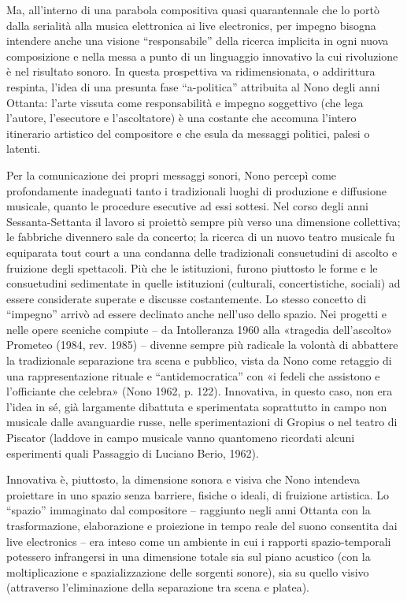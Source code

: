 Ma, all’interno di una parabola compositiva quasi quarantennale che lo portò dalla serialità alla musica elettronica ai live electronics, per impegno bisogna intendere anche una visione “responsabile” della ricerca implicita in ogni nuova composizione e nella messa a punto di un linguaggio innovativo la cui rivoluzione è nel risultato sonoro. In questa prospettiva va ridimensionata, o addirittura respinta, l’idea di una presunta fase “a-politica” attribuita al Nono degli anni Ottanta: l’arte vissuta come responsabilità e impegno soggettivo (che lega l’autore, l’esecutore e l’ascoltatore) è una costante che accomuna l’intero itinerario artistico del compositore e che esula da messaggi politici, palesi o latenti.

Per la comunicazione dei propri messaggi sonori, Nono percepì come profondamente inadeguati tanto i tradizionali luoghi di produzione e diffusione musicale, quanto le procedure esecutive ad essi sottesi. Nel corso degli anni Sessanta-Settanta il lavoro si proiettò sempre più verso una dimensione collettiva; le fabbriche divennero sale da concerto; la ricerca di un nuovo teatro musicale fu equiparata tout court a una condanna delle tradizionali consuetudini di ascolto e fruizione degli spettacoli. Più che le istituzioni, furono piuttosto le forme e le consuetudini sedimentate in quelle istituzioni (culturali, concertistiche, sociali) ad essere considerate superate e discusse costantemente. Lo stesso concetto di “impegno” arrivò ad essere declinato anche nell’uso dello spazio. Nei progetti e nelle opere sceniche compiute – da Intolleranza 1960 alla «tragedia dell’ascolto» Prometeo (1984, rev. 1985) – divenne sempre più radicale la volontà di abbattere la tradizionale separazione tra scena e pubblico, vista da Nono come retaggio di una rappresentazione rituale e “antidemocratica” con «i fedeli che assistono e l’officiante che celebra» (Nono 1962, p. 122). Innovativa, in questo caso, non era l’idea in sé, già largamente dibattuta e sperimentata soprattutto in campo non musicale dalle avanguardie russe, nelle sperimentazioni di Gropius o nel teatro di Piscator (laddove in campo musicale vanno quantomeno ricordati alcuni esperimenti quali Passaggio di Luciano Berio, 1962).

Innovativa è, piuttosto, la dimensione sonora e visiva che Nono intendeva proiettare in uno spazio senza barriere, fisiche o ideali, di fruizione artistica. Lo “spazio” immaginato dal compositore – raggiunto negli anni Ottanta con la trasformazione, elaborazione e proiezione in tempo reale del suono consentita dai live electronics – era inteso come un ambiente in cui i rapporti spazio-temporali potessero infrangersi in una dimensione totale sia sul piano acustico (con la moltiplicazione e spazializzazione delle sorgenti sonore), sia su quello visivo (attraverso l’eliminazione della separazione tra scena e platea).

